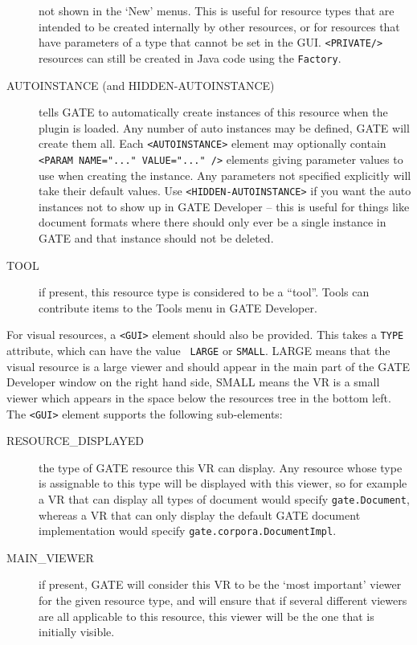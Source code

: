 \begin{description}
  not shown in the `New' menus.  This is useful for resource types
  that are intended to be created internally by other resources, or
  for resources that have parameters of a type that cannot be set in
  the GUI.  \verb|<PRIVATE/>| resources can still be created in Java
  code using the {\tt Factory}.
\item[AUTOINSTANCE (and HIDDEN-AUTOINSTANCE)] tells GATE to automatically
  create instances of this resource when the plugin is loaded.  Any number of
  auto instances may be defined, GATE will create them all.  Each
  \verb|<AUTOINSTANCE>| element may optionally contain
  \verb|<PARAM NAME="..." VALUE="..." />| elements giving parameter values to
  use when creating the instance.  Any parameters not specified explicitly will
  take their default values.  Use \verb|<HIDDEN-AUTOINSTANCE>| if you want the
  auto instances not to show up in GATE Developer -- this is useful for things
  like document formats where there should only ever be a single instance in
  GATE and that instance should not be deleted.
\item[TOOL] if present, this resource type is considered to be a ``tool''.
  Tools can contribute items to the Tools menu in GATE Developer.
\end{description}

For visual resources, a \verb|<GUI>| element should also be provided.
This takes a \verb|TYPE| attribute, which can have the value {\tt
LARGE} or {\tt SMALL}.  LARGE means that the visual resource is a
large viewer and should appear in the main part of the GATE Developer
window on the right hand side, SMALL means the VR is a small viewer
which appears in the space below the resources tree in the bottom
left.  The \verb|<GUI>| element supports the following sub-elements:

\begin{description}
\item[RESOURCE\_DISPLAYED] the type of GATE resource this VR can display.  Any
  resource whose type is assignable to this type will be displayed with this
  viewer, so for example a VR that can display all types of document would
  specify \verb|gate.Document|, whereas a VR that can only display the default
  GATE document implementation would specify \verb|gate.corpora.DocumentImpl|.
\item[MAIN\_VIEWER] if present, GATE will consider this VR to be the `most
  important' viewer for the given resource type, and will ensure that if
  several different viewers are all applicable to this resource, this viewer
  will be the one that is initially visible.
\end{description}

